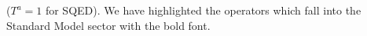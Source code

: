 \documentclass[a4paper,12pt]{article}
\begin{document}
	($ T^a = 1 $ for SQED).
	We have highlighted the operators which fall into the 
	Standard Model sector with the bold font.




	
\end{document}
